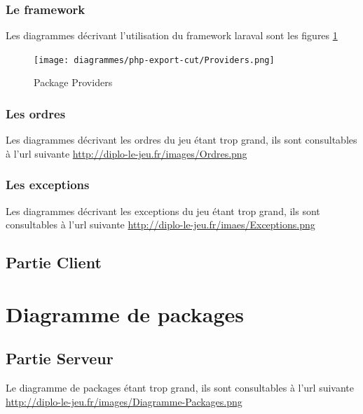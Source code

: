         \newpage
        \subsubsection{Le framework}
        Les diagrammes décrivant l'utilisation du framework laraval sont les figures \ref{pproviders}
			\begin{figure}[!h]
				\centering
                \texttt{[image: diagrammes/php-export-cut/Providers.png]}
                \caption{\label{pproviders}Package Providers}
			\end{figure}
        \newpage

        \newpage
		\subsubsection{Les ordres}
        Les diagrammes décrivant les ordres du jeu étant trop grand, ils sont
        consultables à l'url suivante \url{http://diplo-le-jeu.fr/images/Ordres.png}

        \newpage
		\subsubsection{Les exceptions}
        Les diagrammes décrivant les exceptions du jeu étant trop grand, ils
        sont consultables à l'url suivante \url{http://diplo-le-jeu.fr/imaes/Exceptions.png}

        
    \pagebreak
	\subsection{Partie Client}

    \newpage
\section{Diagramme de packages}
	\subsection{Partie Serveur}
        Le diagramme de packages étant trop grand, ils sont consultables à l'url
        suivante \url{http://diplo-le-jeu.fr/images/Diagramme-Packages.png}

		\newpage

